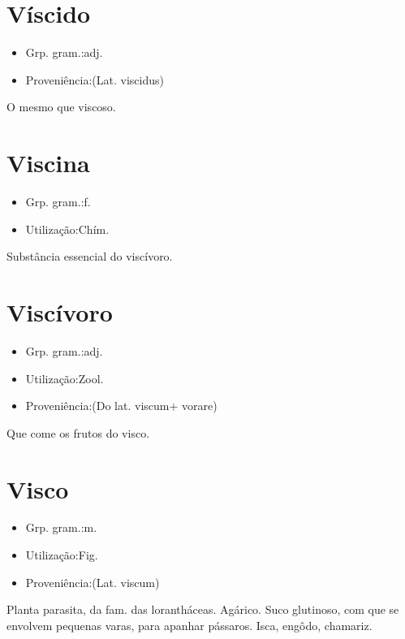\documentclass{article}
\begin{document}
\section{Víscido}
\begin{itemize}
\item {Grp. gram.:adj.}
\end{itemize}
\begin{itemize}
\item {Proveniência:(Lat. \textunderscore viscidus\textunderscore )}
\end{itemize}
O mesmo que \textunderscore viscoso\textunderscore .
\section{Viscina}
\begin{itemize}
\item {Grp. gram.:f.}
\end{itemize}
\begin{itemize}
\item {Utilização:Chím.}
\end{itemize}
Substância essencial do viscívoro.
\section{Viscívoro}
\begin{itemize}
\item {Grp. gram.:adj.}
\end{itemize}
\begin{itemize}
\item {Utilização:Zool.}
\end{itemize}
\begin{itemize}
\item {Proveniência:(Do lat. \textunderscore viscum\textunderscore  + \textunderscore vorare\textunderscore )}
\end{itemize}
Que come os frutos do visco.
\section{Visco}
\begin{itemize}
\item {Grp. gram.:m.}
\end{itemize}
\begin{itemize}
\item {Utilização:Fig.}
\end{itemize}
\begin{itemize}
\item {Proveniência:(Lat. \textunderscore viscum\textunderscore )}
\end{itemize}
Planta parasita, da fam. das lorantháceas.
Agárico.
Suco glutinoso, com que se envolvem pequenas varas, para apanhar pássaros.
Isca, engôdo, chamariz.
\end{document}

